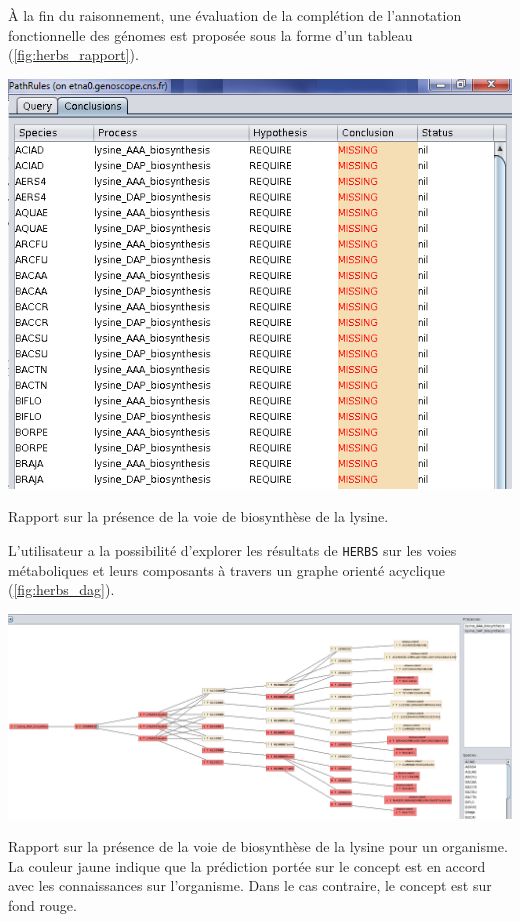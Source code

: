 \begin{refsegment}
À la fin du raisonnement, une évaluation de la complétion de l'annotation fonctionnelle des génomes est proposée sous la forme d'un tableau (\cref{fig:herbs_rapport}).

\begin{shadedfigure}[H]
    \centering
    \includegraphics[width=\textwidth]{img/herbs_conclusion_report.png}
    \caption{Rapport sur la présence de la voie de biosynthèse de la lysine.}
    \label{fig:herbs_rapport}
\end{shadedfigure}

L'utilisateur a la possibilité d'explorer les résultats de \texttt{\gls{HERBS}} sur les voies métaboliques et leurs composants à travers un graphe orienté acyclique (\cref{fig:herbs_dag}).

\begin{landscape}
    \begin{shadedfigure}[H]
        \centering
        \includegraphics[width=\textwidth]{img/herbs_aciad_lysine_dap.png}
        \caption{Rapport sur la présence de la voie de biosynthèse de la lysine pour un organisme. La couleur jaune indique que la prédiction portée sur le concept est en accord avec les connaissances sur l'organisme. Dans le cas contraire, le concept est sur fond rouge. }
        \label{fig:herbs_dag}
    \end{shadedfigure}
\end{landscape}



\end{refsegment}
